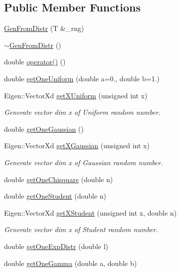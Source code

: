 \subsection*{Public Member Functions}
\begin{DoxyCompactItemize}
\item 
\hyperlink{classGenFromDistr_a9e3401231ba07f8e84c760b892a9eb0a}{Gen\+From\+Distr} (T \&\+\_\+rng)
\item 
\hyperlink{classGenFromDistr_a088eb8a16a206ccffbee7406fc840a90}{$\sim$\+Gen\+From\+Distr} ()
\item 
double \hyperlink{classGenFromDistr_a759d5f09184069456bb02cf0687c04b8}{operator()} ()
\item 
double \hyperlink{classGenFromDistr_a3e32f495d1e6dfa4b152980e8b6c233c}{get\+One\+Uniform} (double a=0., double b=1.)
\item 
Eigen\+::\+Vector\+Xd \hyperlink{classGenFromDistr_af37d022161571f1ed61462b999081b8e}{get\+X\+Uniform} (unsigned int x)
\begin{DoxyCompactList}\small\item\em Generate vector dim x of Uniform random number. \end{DoxyCompactList}\item 
double \hyperlink{classGenFromDistr_aba586e9d1c4d07a30d622e7f16fc13e4}{get\+One\+Gaussian} ()
\item 
Eigen\+::\+Vector\+Xd \hyperlink{classGenFromDistr_a60a61050c09c5f40ad74869a7aa1a6c2}{get\+X\+Gaussian} (unsigned int x)
\begin{DoxyCompactList}\small\item\em Generate vector dim x of Gaussian random number. \end{DoxyCompactList}\item 
double \hyperlink{classGenFromDistr_ad9d10783cc324b3376a078808ba1331b}{get\+One\+Chisquare} (double n)
\item 
double \hyperlink{classGenFromDistr_a7de451b0e96024d6c5216c57a226de76}{get\+One\+Student} (double n)
\item 
Eigen\+::\+Vector\+Xd \hyperlink{classGenFromDistr_a018afaad1a8ea5f4722a412629da610d}{get\+X\+Student} (unsigned int x, double n)
\begin{DoxyCompactList}\small\item\em Generate vector dim x of Student random number. \end{DoxyCompactList}\item 
double \hyperlink{classGenFromDistr_ada0a44362ef21afe2926620f3af489fd}{get\+One\+Exp\+Distr} (double l)
\item 
double \hyperlink{classGenFromDistr_a163dfedc722d8f808ccaae299523db5a}{get\+One\+Gamma} (double a, double b)
\end{DoxyCompactItemize}


